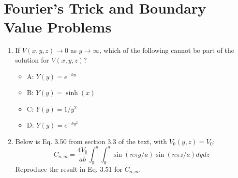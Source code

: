 \documentclass[10pt]{article}
\begin{document}
\section{Fourier's Trick and Boundary Value Problems}

\begin{enumerate}
\item If $V(x,y,z) \to 0$ as $y \to \infty$, which of the following cannot be part of the solution for $V(x,y,z)$?
\begin{itemize}
\item A: $Y(y) = e^{-ky}$
\item B: $Y(y) = \sinh(x)$
\item C: $Y(y) = 1/y^2$
\item D: $Y(y) = e^{-ky^2}$
\end{itemize}
\item Below is Eq. 3.50 from section 3.3 of the text, with $V_0(y,z) = V_0$:
\begin{equation}
C_{n,m} = \frac{4V_0}{ab} \int_0^a \int_0^a \sin(n\pi y/a)\sin(n\pi z/a) dy dz
\end{equation}
Reproduce the result in Eq. 3.51 for $C_{n,m}$.
\end{enumerate}
\end{document}
